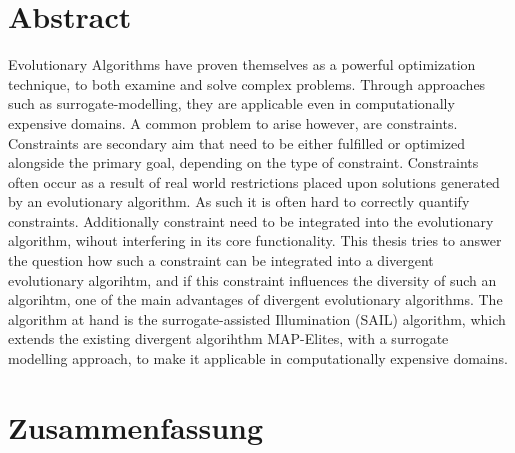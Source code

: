 
\clearpage
\section*{Abstract}
Evolutionary Algorithms have proven themselves as a powerful optimization technique, to both examine and solve complex problems.
Through approaches such as surrogate-modelling, they are applicable even in computationally expensive domains.
A common problem to arise however, are constraints.
Constraints are secondary aim that need to be either fulfilled or optimized alongside the primary goal, depending on the type of constraint.
Constraints often occur as a result of real world restrictions placed upon solutions generated by an evolutionary algorithm.
As such it is often hard to correctly quantify constraints.
Additionally constraint need to be integrated into the evolutionary algorithm, wihout interfering in its core functionality.
This thesis tries to answer the question how such a constraint can be integrated into a divergent evolutionary algorihtm, and if this constraint influences the diversity of such an algorihtm, one of the main advantages of divergent evolutionary algorithms.
The algorithm at hand is the surrogate-assisted Illumination (SAIL) algorithm, which extends the existing divergent algorihthm MAP-Elites, with a surrogate modelling approach, to make it applicable in computationally expensive domains.

\clearpage
\section*{Zusammenfassung}

